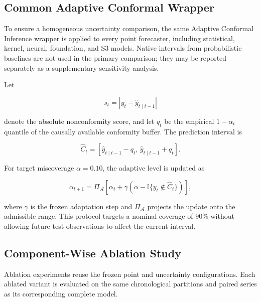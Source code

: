 \documentclass[review,number,sort&compress]{elsarticle}
\begin{document}
\subsection{Common Adaptive Conformal Wrapper}
\label{subsec:common_aci}

To ensure a homogeneous uncertainty comparison, the same Adaptive Conformal Inference wrapper is applied to every point forecaster, including statistical, kernel, neural, foundation, and S3 models. Native intervals from probabilistic baselines are not used in the primary comparison; they may be reported separately as a supplementary sensitivity analysis.

Let

\begin{equation}
s_t
=
\left|
y_t-\widehat{y}_{t\mid t-1}
\right|
\end{equation}

denote the absolute nonconformity score, and let \(q_t\) be the empirical \(1-\alpha_t\) quantile of the causally available conformity buffer. The prediction interval is

\begin{equation}
\widehat{C}_t
=
\left[
\widehat{y}_{t\mid t-1}-q_t,\,
\widehat{y}_{t\mid t-1}+q_t
\right].
\label{eq:common_aci_interval}
\end{equation}

For target miscoverage \(\alpha=0.10\), the adaptive level is updated as

\begin{equation}
\alpha_{t+1}
=
\Pi_{\mathcal{A}}
\left[
\alpha_t
+
\gamma
\left(
\alpha-
\mathbb{I}\{y_t\notin\widehat{C}_t\}
\right)
\right],
\label{eq:common_aci_update}
\end{equation}

where \(\gamma\) is the frozen adaptation step and \(\Pi_{\mathcal{A}}\) projects the update onto the admissible range. This protocol targets a nominal coverage of \(90\%\) without allowing future test observations to affect the current interval.

\subsection{Component-Wise Ablation Study}
\label{subsec:ablation}

Ablation experiments reuse the frozen point and uncertainty configurations. Each ablated variant is evaluated on the same chronological partitions and paired series as its corresponding complete model.
\end{document}
